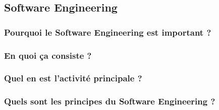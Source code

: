 \subsection{Software Engineering}

\subsubsection{Pourquoi le Software Engineering est important ?}
\subsubsection{En quoi ça consiste ?}
\subsubsection{Quel en est l'activité principale ?}
\subsubsection{Quels sont les principes du Software Engineering ?}